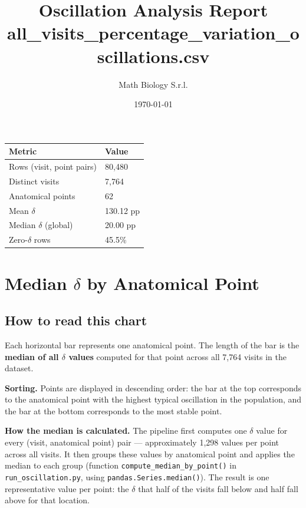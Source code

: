 \documentclass[11pt,a4paper]{article}
\title{%
  \textcolor{mathdark}{\textbf{Oscillation Analysis Report}}\\[4pt]
  \large all\_visits\_percentage\_variation\_oscillations.csv}
\author{Math Biology S.r.l.}
\date{\today}
\begin{document}
\maketitle
\tableofcontents
\bigskip

\noindent
\begin{tabular}{@{}ll@{}}
\toprule
\textbf{Metric} & \textbf{Value} \\
\midrule
Rows (visit, point pairs) & 80,480 \\
Distinct visits           & 7,764 \\
Anatomical points         & 62 \\
Mean $\delta$             & 130.12 pp \\
Median $\delta$ (global)  & 20.00 pp \\
Zero-$\delta$ rows        & 45.5\% \\
\bottomrule
\end{tabular}

\newpage

\section{Median \texorpdfstring{$\delta$}{delta} by Anatomical Point}

\subsection*{How to read this chart}

Each horizontal bar represents one anatomical point.
The length of the bar is the \textbf{median of all $\delta$ values} computed for
that point across all 7,764 visits in the dataset.

\textbf{Sorting.}
Points are displayed in descending order: the bar at the top corresponds to the
anatomical point with the highest typical oscillation in the population, and the
bar at the bottom corresponds to the most stable point.

\textbf{How the median is calculated.}
The pipeline first computes one $\delta$ value for every (visit, anatomical point)
pair --- approximately 1,298 values per
point across all visits.
It then groups these values by anatomical point and applies the median to each
group (function \texttt{compute\_median\_by\_point()} in
\texttt{run\_oscillation.py}, using \texttt{pandas.Series.median()}).
The result is one representative value per point: the $\delta$ that half of
the visits fall below and half fall above for that location.
\end{document}
